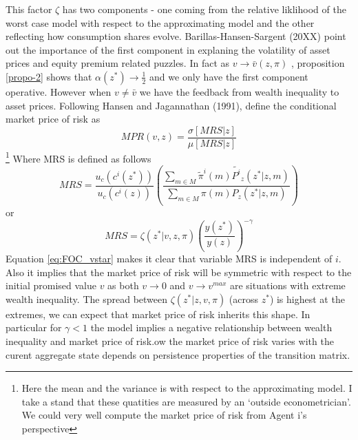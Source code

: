 \documentclass[12pt]{article}
\newtheorem{proposition}{Proposition}
\begin{document}
This factor $\zeta$ has two components - one coming from the relative liklihood of the worst case model with respect to the approximating model and the other reflecting how consumption shares evolve. Barillas-Hansen-Sargent (20XX) point out the importance of the first component in explaning the volatility of asset prices and equity premium related puzzles. In fact as $v\to \bar{v}(z,\pi)$ , proposition \ref{propo-2} shows that $\alpha(z^*)\to \frac{1}{2}$ and we only have the first component operative. However when $v\neq \bar{v}$ we have the feedback from wealth inequality to asset prices. 
Following Hansen and Jagannathan (1991), define the conditional market price of risk as 
\[MPR(v,z)=\frac{\sigma[MRS|z]}{\mu[MRS|z]}\] \footnote{Here the mean and the variance is with respect to the approximating model. I take a stand that these quatities are measured by an `outside econometrician'. We could very well compute the market price of risk from Agent i's perspective}
Where MRS is defined as follows
\[MRS=\frac{u_c(c^i(z^*))}{u_c(c^i(z))}\left(\frac{\sum_{m \in M}\tilde{\pi}^{i}(m)\tilde{P^i}_z(z^* |z,m)}{\sum_{m \in M}{\pi(m)P_{z}(z^*|z,m)}} \right)\] 
or
\begin{equation}
MRS=\zeta(z^*|v,z,\pi)\left(\frac{y(z^*)}{y(z)}\right)^{-\gamma}
\end{equation}
%
Equation \ref{eq:FOC_vstar} makes it clear that variable MRS is independent of $i$. Also it implies that the market price of risk will be symmetric with respect to the initial promised value $v$ as both  $v \to 0$ and $v \to v^{max}$ are situations with extreme wealth inequality. The spread 
between $\zeta(z^*|z,v,\pi)$ (across $z^*$) is highest at the extremes, we can expect that market price of risk inherits this shape. In particular for $\gamma <1$ the model implies a negative relationship between wealth inequality and market price of risk.ow the market price of risk varies with the curent aggregate state depends on persistence properties of the transition matrix. 

\end{document}
